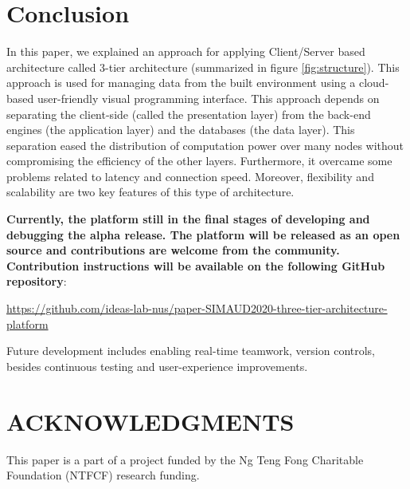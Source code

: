 \documentclass{scsSimAUDPaperFormat}
\begin{document}
\section{Conclusion}
In this paper, we explained an approach for applying Client/Server based architecture called 3-tier architecture (summarized in figure \ref{fig:structure}). This approach is used for managing data from the built environment using a cloud-based user-friendly visual programming interface. This approach depends on separating the client-side (called the presentation layer) from the back-end engines (the application layer) and the databases (the data layer). This separation eased the distribution of computation power over many nodes without compromising the efficiency of the other layers. Furthermore, it overcame some problems related to latency and connection speed. Moreover, flexibility and scalability are two key features of this type of architecture. 

\textbf{Currently, the platform still in the final stages of developing and debugging the alpha release. The platform will be released as an open source and contributions are welcome from the community. Contribution instructions will be available on the following GitHub repository}:

\href{https://github.com/ideas-lab-nus/paper-SIMAUD2020-three-tier-architecture-platform}{https://github.com/ideas-lab-nus/paper-SIMAUD2020-three-tier-architecture-platform}

Future development includes enabling real-time teamwork, version controls, besides continuous testing and user-experience improvements. 

\section*{ACKNOWLEDGMENTS}
This paper is a part of a project funded by the Ng Teng Fong Charitable Foundation (NTFCF) research funding.

\balance





\end{document}
